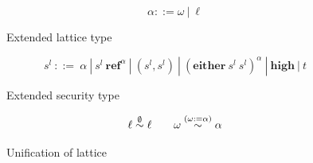 \documentclass[a4paper]{report}
\newcommand{\st}{s^l}
\begin{document}
\begin{figure}[t]
\[
\alpha ::= \omega\ |\ \ell
\]
\caption{Extended lattice type}
\label{fig:unif:lt}
\end{figure}

\begin{figure}[t]
\[
\st\ ::=\ \alpha\ |\ \st\ \mathbf{ref}^{\alpha}\ |\ (\st,\st)\ |\ (\mathbf{either}\ \st\ \st)^{\alpha}\ 
        |\ \mathbf{high}\ |\ t
\]
\caption{Extended security type}
\label{fig:unif:st}
\end{figure}

\begin{figure}[t]
\[
\ell\stackrel{{\emptyset}}{\sim} \ell\quad \quad \omega\stackrel{{(\omega:=\alpha)}}{\sim} \alpha
\]
\caption{Unification of lattice}
\label{fig:unif:ul}
\end{figure}
\end{document}
